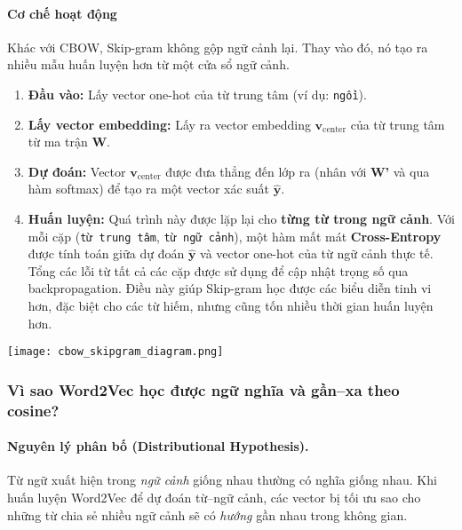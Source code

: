 \paragraph{Cơ chế hoạt động}
Khác với CBOW, Skip-gram không gộp ngữ cảnh lại. Thay vào đó, nó tạo ra nhiều mẫu huấn luyện hơn từ một cửa sổ ngữ cảnh.
\begin{enumerate}
    \item \textbf{Đầu vào:} Lấy vector one-hot của từ trung tâm (ví dụ: \texttt{ngồi}).
    \item \textbf{Lấy vector embedding:} Lấy ra vector embedding $\mathbf{v}_{\text{center}}$ của từ trung tâm từ ma trận \textbf{W}.
    \item \textbf{Dự đoán:} Vector $\mathbf{v}_{\text{center}}$ được đưa thẳng đến lớp ra (nhân với \textbf{W'} và qua hàm softmax) để tạo ra một vector xác suất $\hat{\mathbf{y}}$.
    \item \textbf{Huấn luyện:} Quá trình này được lặp lại cho \textbf{từng từ trong ngữ cảnh}. Với mỗi cặp (\texttt{từ trung tâm}, \texttt{từ ngữ cảnh}), một hàm mất mát \textbf{Cross-Entropy} được tính toán giữa dự đoán $\hat{\mathbf{y}}$ và vector one-hot của từ ngữ cảnh thực tế. Tổng các lỗi từ tất cả các cặp được sử dụng để cập nhật trọng số qua backpropagation. Điều này giúp Skip-gram học được các biểu diễn tinh vi hơn, đặc biệt cho các từ hiếm, nhưng cũng tốn nhiều thời gian huấn luyện hơn.
\end{enumerate}

\begin{center}
    \texttt{[image: cbow\_skipgram\_diagram.png]}
    \label{fig:cbow_skipgram_diagram}
\end{center}

\subsubsection{Vì sao Word2Vec học được ngữ nghĩa và gần--xa theo cosine?}
\label{sssec:w2v_why_semantics}

\paragraph{Nguyên lý phân bố (Distributional Hypothesis).}
Từ ngữ xuất hiện trong \emph{ngữ cảnh} giống nhau thường có nghĩa giống nhau. Khi huấn luyện Word2Vec để dự đoán từ--ngữ cảnh, các vector bị tối ưu sao cho những từ chia sẻ nhiều ngữ cảnh sẽ có \emph{hướng} gần nhau trong không gian.

